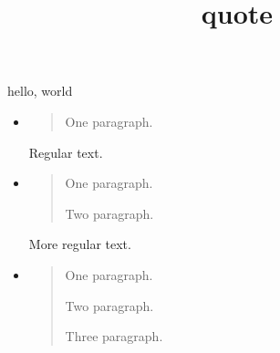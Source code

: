 \documentclass{amsart}
\title{quote}
\begin{document}
\maketitle

hello, world

\begin{itemize}

\item \begin{quote}
One paragraph.
\end{quote}

Regular text.

\item \begin{quote}
One paragraph.

Two paragraph.
\end{quote}

More regular text.

\item
\begin{quote}
One paragraph.

Two paragraph.

Three paragraph.
\end{quote}

\end{itemize}
\end{document}
